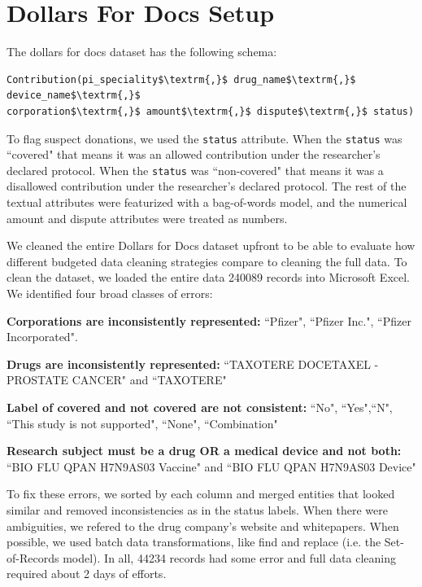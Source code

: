 \section{Dollars For Docs Setup}\label{dfd-errors}
The dollars for docs dataset has the following schema:
\begin{lstlisting}[mathescape,basicstyle={\scriptsize}]
Contribution(pi_speciality$\textrm{,}$ drug_name$\textrm{,}$ device_name$\textrm{,}$
corporation$\textrm{,}$ amount$\textrm{,}$ dispute$\textrm{,}$ status)
\end{lstlisting}
To flag suspect donations, we used the \texttt{status} attribute.
When the \texttt{status} was ``covered" that means it was an allowed contribution under the researcher's declared protocol.
When the \texttt{status} was ``non-covered" that means it was a disallowed contribution under the researcher's declared protocol.
The rest of the textual attributes were featurized with a bag-of-words model, and the numerical amount and dispute attributes were treated as numbers.

We cleaned the entire Dollars for Docs dataset upfront to be able to evaluate how different budgeted data cleaning strategies compare to cleaning the full data.
To clean the dataset, we loaded the entire data 240089 records into Microsoft Excel. We identified four broad classes of errors:
\vspace{0.25em}

\noindent \textbf{Corporations are inconsistently represented: } ``Pfizer", ``Pfizer Inc.", ``Pfizer Incorporated".

\vspace{0.25em}

\noindent \textbf{Drugs are inconsistently represented: } ``TAXOTERE  DOCETAXEL -PROSTATE CANCER" and ``TAXOTERE"

\vspace{0.25em}

\noindent \textbf{Label of covered and not covered are not consistent: } ``No", ``Yes",``N", ``This study is not supported", ``None", ``Combination"

\vspace{0.25em} 

\noindent \textbf{Research subject must be a drug OR a medical device and not both: } ``BIO FLU QPAN H7N9AS03 Vaccine" and ``BIO FLU QPAN H7N9AS03 Device"

\vspace{0.5em} 

To fix these errors, we sorted by each column and merged entities that looked similar and removed inconsistencies as in the status labels. 
When there were ambiguities, we refered to the drug company's website and whitepapers.
When possible, we used batch data transformations, like find and replace (i.e. the Set-of-Records model).
In all, 44234 records had some error and full data cleaning required about 2 days of efforts.

